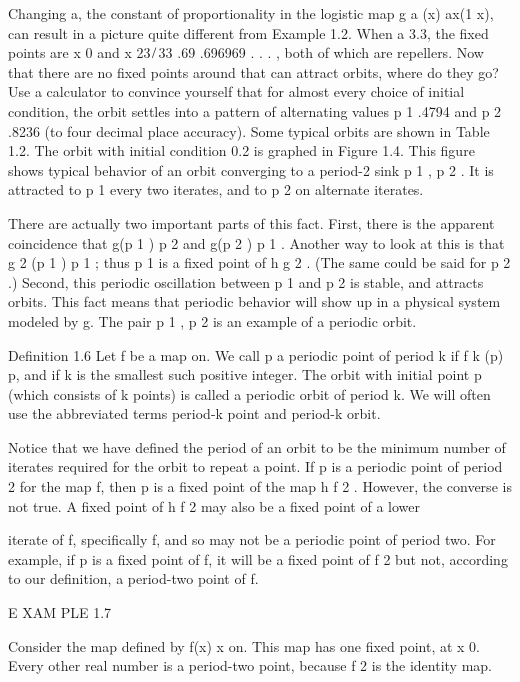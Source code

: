 Changing a, the constant of proportionality in the logistic map g a (x)  ax(1  x), can result in a picture 
quite different from Example 1.2. When a  3.3, the ﬁxed points are x  0 and x  23 ̸ 33  .69  .696969 . . . 
, both of which are repellers. Now that there are no ﬁxed points around that can attract orbits, where do 
they go? Use a calculator to convince yourself that for almost every choice of initial condition, the orbit 
settles into a pattern of alternating values p 1  .4794 and p 2  .8236 (to four decimal place accuracy). 
Some typical orbits are shown in Table 1.2. The orbit with initial condition 0.2 is graphed in Figure 1.4. 
This ﬁgure shows typical behavior of an orbit converging to a period-2 sink p 1 , p 2  . It is attracted 
to p 1 every two iterates, and to p 2 on alternate iterates.

There are actually two important parts of this fact. First, there is the apparent coincidence that g(p 1 )  
p 2 and g(p 2 )  p 1 . Another way to look at this is that g 2 (p 1 )  p 1 ; thus p 1 is a ﬁxed point of h  
g 2 . (The same could be said for p 2 .) Second, this periodic oscillation between p 1 and p 2 is stable, 
and attracts orbits. This fact means that periodic behavior will show up in a physical system modeled by g. 
The pair p 1 , p 2  is an example of a periodic orbit.

Deﬁnition 1.6 Let f be a map on. We call p a periodic point of period k if f k (p)  p, and if k is the 
smallest such positive integer. The orbit with initial point p (which consists of k points) is called a 
periodic orbit of period k. We will often use the abbreviated terms period-k point and period-k orbit.

Notice that we have deﬁned the period of an orbit to be the minimum number of iterates required for the 
orbit to repeat a point. If p is a periodic point of period 2 for the map f, then p is a ﬁxed point of the 
map h  f 2 . However, the converse is not true. A ﬁxed point of h  f 2 may also be a ﬁxed point of a 
lower


iterate of f, speciﬁcally f, and so may not be a periodic point of period two. For example, if p is a 
ﬁxed point of f, it will be a ﬁxed point of f 2 but not, according to our deﬁnition, a period-two point 
of f.

E XAM PLE 1.7

Consider the map deﬁned by f(x)  x on. This map has one ﬁxed point, at x  0. Every other real number is a 
period-two point, because f 2 is the identity map.

